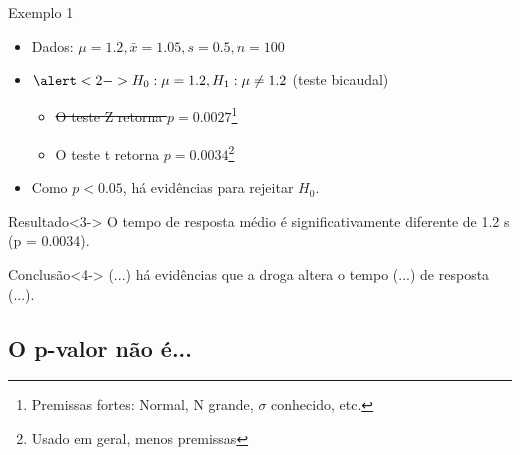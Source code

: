 \documentclass{beamer}
\begin{document}
\begin{frame}{\scriptsize Exemplo 1}
    \begin{itemize}
      \scriptsize
    \item Dados: $\mu = 1.2, \bar{x} = 1.05, s = 0.5, n=100$
    \item $\alert<2->{H_0: \mu = 1.2}, H_1: \mu \ne 1.2$ (teste bicaudal)
      \begin{itemize}
        \scriptsize
      \item \sout{O teste Z retorna $p = 0.0027$}\footnote{Premissas fortes: Normal, N grande, $\sigma$ conhecido, etc.}
      \item O teste t retorna $p = 0.0034$\footnote{Usado em geral, menos premissas}
      \end{itemize}
    \item<2-> Como $p < 0.05$, há evidências para rejeitar \alert<2->{$H_0$}.
    \end{itemize}
  \begin{exampleblock}{Resultado}<3->
    \footnotesize
    O tempo de resposta médio é \alert{significativamente} diferente de 1.2 s ({\footnotesize p = 0.0034}).
  \end{exampleblock}
  \begin{exampleblock}{Conclusão}<4->
    \footnotesize
    (...) há evidências que a droga altera o tempo (...)  de resposta (...).
  \end{exampleblock}

\end{frame}

\subsection{O p-valor não é...}
\end{document}
